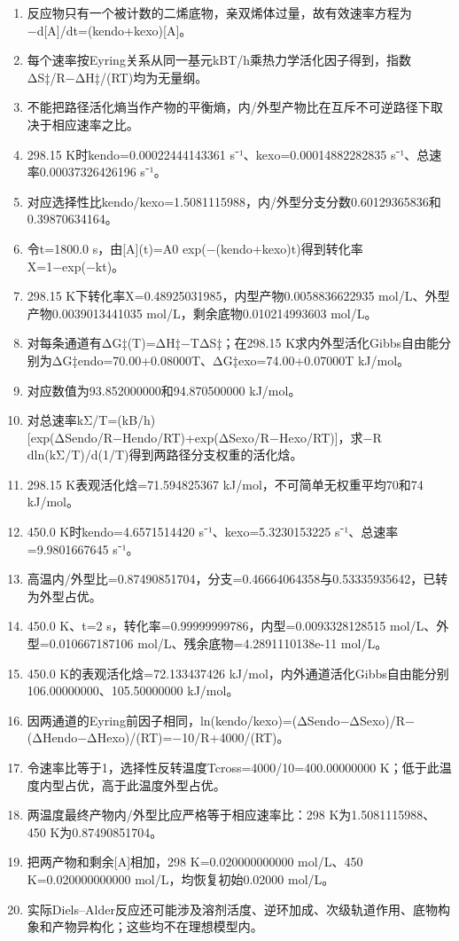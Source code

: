 \documentclass[UTF8,11pt,a4paper]{ctexart}
\begin{document}
\begin{enumerate}
\item 反应物只有一个被计数的二烯底物，亲双烯体过量，故有效速率方程为−d[A]/dt=(kendo+kexo)[A]。
\item 每个速率按Eyring关系从同一基元kBT/h乘热力学活化因子得到，指数ΔS‡/R−ΔH‡/(RT)均为无量纲。
\item 不能把路径活化熵当作产物的平衡熵，内/外型产物比在互斥不可逆路径下取决于相应速率之比。
\item 298.15 K时kendo=0.00022444143361 s⁻¹、kexo=0.00014882282835 s⁻¹、总速率0.00037326426196 s⁻¹。
\item 对应选择性比kendo/kexo=1.5081115988，内/外型分支分数0.60129365836和0.39870634164。
\item 令t=1800.0 s，由[A](t)=A0 exp(−(kendo+kexo)t)得到转化率X=1−exp(−kt)。
\item 298.15 K下转化率X=0.48925031985，内型产物0.0058836622935 mol/L、外型产物0.0039013441035 mol/L，剩余底物0.010214993603 mol/L。
\item 对每条通道有ΔG‡(T)=ΔH‡−TΔS‡；在298.15 K求内外型活化Gibbs自由能分别为ΔG‡endo=70.00+0.08000T、ΔG‡exo=74.00+0.07000T kJ/mol。
\item 对应数值为93.852000000和94.870500000 kJ/mol。
\item 对总速率kΣ/T=(kB/h)[exp(ΔSendo/R−Hendo/RT)+exp(ΔSexo/R−Hexo/RT)]，求−R dln(kΣ/T)/d(1/T)得到两路径分支权重的活化焓。
\item 298.15 K表观活化焓=71.594825367 kJ/mol，不可简单无权重平均70和74 kJ/mol。
\item 450.0 K时kendo=4.6571514420 s⁻¹、kexo=5.3230153225 s⁻¹、总速率=9.9801667645 s⁻¹。
\item 高温内/外型比=0.87490851704，分支=0.46664064358与0.53335935642，已转为外型占优。
\item 450.0 K、t=2 s，转化率=0.99999999786，内型=0.0093328128515 mol/L、外型=0.010667187106 mol/L、残余底物=4.2891110138e-11 mol/L。
\item 450.0 K的表观活化焓=72.133437426 kJ/mol，内外通道活化Gibbs自由能分别106.00000000、105.50000000 kJ/mol。
\item 因两通道的Eyring前因子相同，ln(kendo/kexo)=(ΔSendo−ΔSexo)/R−(ΔHendo−ΔHexo)/(RT)=−10/R+4000/(RT)。
\item 令速率比等于1，选择性反转温度Tcross=4000/10=400.00000000 K；低于此温度内型占优，高于此温度外型占优。
\item 两温度最终产物内/外型比应严格等于相应速率比：298 K为1.5081115988、450 K为0.87490851704。
\item 把两产物和剩余[A]相加，298 K=0.020000000000 mol/L、450 K=0.020000000000 mol/L，均恢复初始0.02000 mol/L。
\item 实际Diels–Alder反应还可能涉及溶剂活度、逆环加成、次级轨道作用、底物构象和产物异构化；这些均不在理想模型内。
\end{enumerate}
\end{document}
